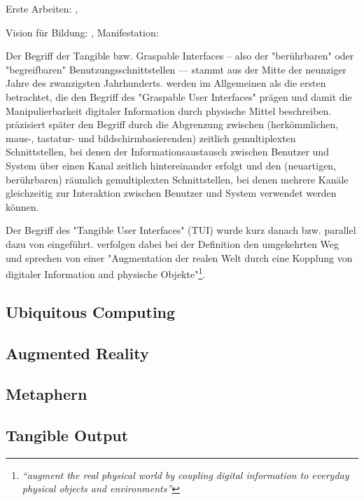 Erste Arbeiten: \citep{Wellner93a}, \citep{Suzuki95}

Vision für Bildung: \citep{Resnick98}, Manifestation: \citep{Zuckerman05}

Der Begriff der Tangible bzw. Graspable Interfaces – also der "berührbaren" oder "begreifbaren" Benutzungsschnittstellen — stammt aus der Mitte der neunziger Jahre des zwanzigsten Jahrhunderts. \citet{Fitzmaurice95} werden im Allgemeinen als die ersten betrachtet, die den Begriff des "Graspable User Interfaces" prägen und damit die Manipulierbarkeit digitaler Information durch physische Mittel beschreiben. \citet{Fitzmaurice96} präzisiert später den Begriff durch die Abgrenzung zwischen (herkömmlichen, maus-, tastatur- und bildschirmbasierenden) zeitlich gemultiplexten Schnittstellen, bei denen der Informationsaustausch zwischen Benutzer und System über einen Kanal zeitlich hintereinander erfolgt und den (neuartigen, berührbaren) räumlich gemultiplexten Schnittstellen, bei denen mehrere Kanäle gleichzeitig zur Interaktion zwischen Benutzer und System verwendet werden können. 

Der Begriff des "Tangible User Interfaces" (TUI) wurde kurz danach bzw. parallel dazu von \citet{Ishii97} eingeführt. \citeauthor{Ishii97} verfolgen dabei bei der Definition den umgekehrten Weg und sprechen von einer "Augmentation der realen Welt durch eine Kopplung von digitaler Information and physische Objekte"\footnote{\emph{“augment the real physical world by coupling digital information to everyday physical objects and environments”}\citep{Ishii97}}. 

\subsection{Ubiquitous Computing}

\subsection{Augmented Reality} 

\subsection{Metaphern} %
\label{ssub:metaphern}


\subsection{Tangible Output} %
\label{ssub:tangible_output}

